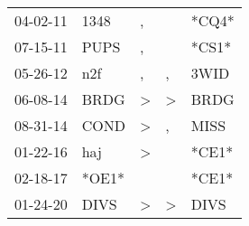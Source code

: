 \begin{supertabular}{lllll}
 04-02-11 &   1348 &             , &               &  *CQ4* \\
 07-15-11 &   PUPS &             , &               &  *CS1* \\
 05-26-12 &    n2f &             , &             , &   3WID \\
 06-08-14 &   BRDG &  \textgreater &  \textgreater &   BRDG \\
 08-31-14 &   COND &  \textgreater &             , &   MISS \\
 01-22-16 &    haj &  \textgreater &               &  *CE1* \\
 02-18-17 &  *OE1* &               &               &  *CE1* \\
 01-24-20 &   DIVS &  \textgreater &  \textgreater &   DIVS \\
\end{supertabular}
